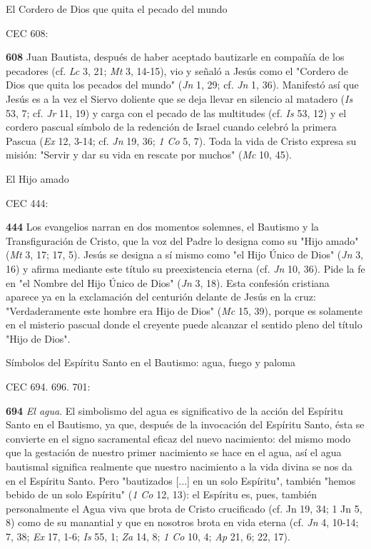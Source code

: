 \documentclass[]{article}
\begin{document}
El Cordero de Dios que quita el pecado del mundo

CEC 608:

\textbf{608} Juan Bautista, después de haber aceptado bautizarle en
compañía de los pecadores (cf. \emph{Lc} 3, 21; \emph{Mt} 3, 14-15), vio
y señaló a Jesús como el "Cordero de Dios que quita los pecados del
mundo" (\emph{Jn} 1, 29; cf. \emph{Jn} 1, 36). Manifestó así que Jesús
es a la vez el Siervo doliente que se deja llevar en silencio al
matadero (\emph{Is} 53, 7; cf. \emph{Jr} 11, 19) y carga con el pecado
de las multitudes (cf. \emph{Is} 53, 12) y el cordero pascual símbolo de
la redención de Israel cuando celebró la primera Pascua (\emph{Ex} 12,
3-14; cf. \emph{Jn} 19, 36; \emph{1 Co} 5, 7). Toda la vida de Cristo
expresa su misión: "Servir y dar su vida en rescate por muchos"
(\emph{Mc} 10, 45).

El Hijo amado

CEC 444:

\textbf{444} Los evangelios narran en dos momentos solemnes, el Bautismo
y la Transfiguración de Cristo, que la voz del Padre lo designa como su
"Hijo amado" (\emph{Mt} 3, 17; 17, 5). Jesús se designa a sí mismo como
"el Hijo Único de Dios" (\emph{Jn} 3, 16) y afirma mediante este título
su preexistencia eterna (cf. \emph{Jn} 10, 36). Pide la fe en "el Nombre
del Hijo Único de Dios" (\emph{Jn} 3, 18). Esta confesión cristiana
aparece ya en la exclamación del centurión delante de Jesús en la cruz:
"Verdaderamente este hombre era Hijo de Dios" (\emph{Mc} 15, 39), porque
es solamente en el misterio pascual donde el creyente puede alcanzar el
sentido pleno del título "Hijo de Dios".

Símbolos del Espíritu Santo en el Bautismo: agua, fuego y paloma

CEC 694. 696. 701:

\textbf{694} \emph{El agua}. El simbolismo del agua es significativo de
la acción del Espíritu Santo en el Bautismo, ya que, después de la
invocación del Espíritu Santo, ésta se convierte en el signo sacramental
eficaz del nuevo nacimiento: del mismo modo que la gestación de nuestro
primer nacimiento se hace en el agua, así el agua bautismal significa
realmente que nuestro nacimiento a la vida divina se nos da en el
Espíritu Santo. Pero "bautizados {[}...{]} en un solo Espíritu", también
"hemos bebido de un solo Espíritu" (\emph{1 Co} 12, 13): el Espíritu es,
pues, también personalmente el Agua viva que brota de Cristo crucificado
(cf. Jn 19, 34; 1 Jn 5, 8) como de su manantial y que en nosotros brota
en vida eterna (cf. \emph{Jn} 4, 10-14; 7, 38; \emph{Ex} 17, 1-6;
\emph{Is} 55, 1; \emph{Za} 14, 8; \emph{1 Co} 10, 4; \emph{Ap} 21, 6;
22, 17).
\end{document}
